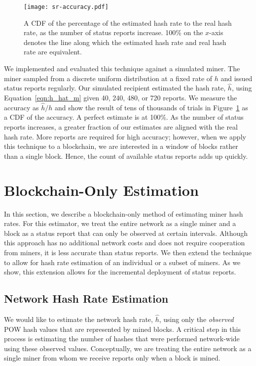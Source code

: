 \documentclass[10pt,sigconf]{acmart}
\newcommand{\para }[1]{\smallskip \noindent {\bf #1}}
\newcommand{\1}{{\em (i)}}
\newcommand{\2}{{\em (ii)}}
\newcommand{\3}{{\em (iii)}}
\newcommand{\4}{{\em (iv)}}
\newcommand{\5}{{\em (v)}}
\begin{document}
\begin{figure}[t]   \centering
  \centerline{\texttt{[image: sr-accuracy.pdf]}}
  \caption{A CDF of the percentage of the estimated hash rate to the
    real hash rate, as the number of status reports increase. 100\% on
    the $x$-axis denotes the line along which the estimated hash rate
    and real hash rate are equivalent.}
   \label{fig:n-hat}
\end{figure}

\para{Empirical evaluation of accuracy.} We implemented and evaluated this technique against a simulated miner. The miner sampled from a discrete uniform distribution at a fixed rate of $h$ and issued status reports regularly. Our simulated recipient estimated the hash rate, $\hat{h}$, using Equation~\ref{eqn:h_hat_m} given 40, 240, 480, or 720 reports. We measure the accuracy as $\hat{h}/h$ and show the result of tens of thousands of trials in Figure~\ref{fig:n-hat} as a CDF of the accuracy. A perfect estimate is at 100\%. 
As the number of status reports increases, a greater fraction of
our estimates are aligned with the real hash rate. More reports are required for high accuracy; however, when we apply this technique to a blockchain, we are interested in a window of blocks rather than a single block. Hence, the count of available status reports adds up quickly. 

\section{Blockchain-Only Estimation}\label{sec:mmconsensus}

In this section, we describe a blockchain-only method of estimating
miner hash rates. For this estimator, we treat the entire network as a single miner and a block as a status report 
that can only be observed at certain intervals. Although this approach has no additional network costs and does not require cooperation from miners, it is less accurate than status reports.  We then extend the technique to allow for hash rate estimation of an individual or a subset of miners. As we show, this extension allows for the incremental deployment of status reports. 

\subsection{Network Hash Rate Estimation}\label{sec:networkhash}

We would like to estimate the network hash rate, $\hat{h}$, using only
the \emph{observed} POW hash values that are represented by mined blocks. A
critical step in this process is estimating the number of hashes that
were performed network-wide using these observed values. Conceptually,
we are treating the entire network as a single miner from whom we
receive reports only when a block is mined.
\end{document}
